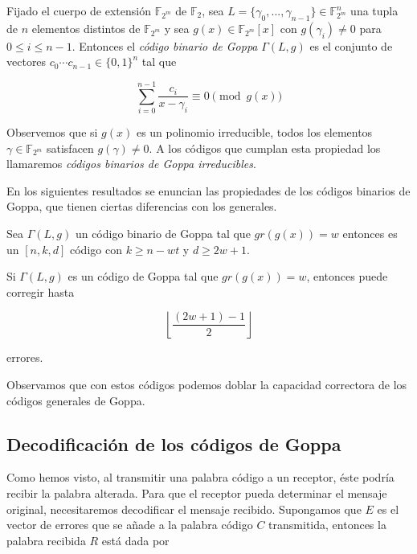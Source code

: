 \begin{definition}

    Fijado el cuerpo de extensión $\mathbb{F}_{2^m}$ de $\mathbb{F}_2$, sea $L = \{ \gamma_0, ..., \gamma_{n-1} \} \in \mathbb{F}_{2^m}^n$ una tupla de $n$ elementos distintos de $\mathbb{F}_{2^m}$ y sea $g(x) \in \mathbb{F}_{2^m}[x]$ con $g(\gamma_i) \neq 0$ para $0 \leq i \leq n - 1$. Entonces el \emph{código binario de Goppa} $\Gamma(L,g)$ es el conjunto de vectores $c_0 \cdots c_{n-1} \in \{ 0, 1 \}^n$ tal que 

    \begin{equation}
        \sum_{i=0}^{n-1} \frac{c_i}{x - \gamma_i} \equiv 0 \pmod{g(x)}
    \end{equation}
\end{definition}

Observemos que si $g(x)$ es un polinomio irreducible, todos los elementos $\gamma \in \mathbb{F}_{2^m}$ satisfacen $g(\gamma) \neq 0$. A los códigos que cumplan esta propiedad los llamaremos \emph{códigos binarios de Goppa irreducibles}.

En los siguientes resultados se enuncian las propiedades de los códigos binarios de Goppa, que tienen ciertas diferencias con los generales.

\begin{theorem}
    Sea $\Gamma(L,g)$ un código binario de Goppa tal que $gr(g(x)) = w$ entonces es un $[n, k, d]$ código con $k \geq n - wt$ y $d \geq 2w + 1$.
\end{theorem}

\begin{corollary}
    Si $\Gamma(L,g)$ es un código de Goppa tal que $gr(g(x)) = w$, entonces puede corregir hasta

    $$\left\lfloor \frac{(2w + 1) - 1}{2} \right\rfloor $$

    errores.
\end{corollary}

Observamos que con estos códigos podemos doblar la capacidad correctora de los códigos generales de Goppa.


\subsection{Decodificación de los códigos de Goppa}

Como hemos visto, al transmitir una palabra código a un receptor, éste podría recibir la palabra alterada. Para que el receptor pueda determinar el mensaje original, necesitaremos decodificar el mensaje recibido. Supongamos que $E$ es el vector de errores que se añade a la palabra código $C$ transmitida, entonces la palabra recibida $R$ está dada por

